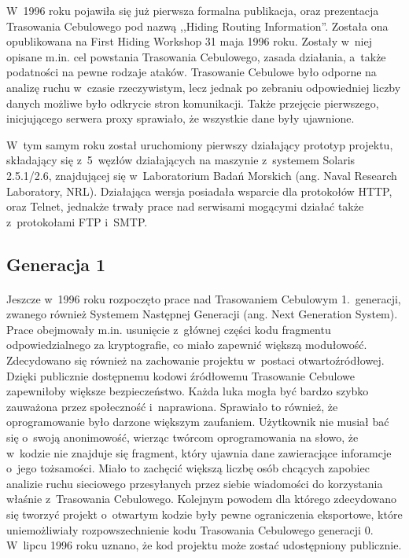 W~1996 roku pojawiła się już pierwsza formalna publikacja, oraz prezentacja Trasowania Cebulowego pod nazwą ,,Hiding Routing Information''. Została ona opublikowana na First Hiding Workshop 31 maja 1996 roku. Zostały w~niej opisane m.in. cel powstania Trasowania Cebulowego, zasada działania, a~także podatności na pewne rodzaje ataków. Trasowanie Cebulowe było odporne na analizę ruchu w~czasie rzeczywistym, lecz jednak po zebraniu odpowiedniej liczby danych możliwe było odkrycie stron komunikacji. Także przejęcie pierwszego, inicjującego serwera proxy sprawiało, że wszystkie dane były ujawnione\cite{hiding_routing_information}.

W~tym samym roku został uruchomiony pierwszy działający prototyp projektu, składający się z~5~węzłów działających na maszynie z~systemem Solaris 2.5.1/2.6, znajdującej się w~Laboratorium Badań Morskich (ang. Naval Research Laboratory, NRL)\cite{onion_router_history}. Działająca wersja posiadała wsparcie dla protokołów HTTP, oraz Telnet, jednakże trwały prace nad serwisami mogącymi działać także z~protokołami FTP i~SMTP\cite{hiding_routing_information}.

\subsection{Generacja 1}\paragraph{}
Jeszcze w~1996 roku rozpoczęto prace nad Trasowaniem Cebulowym 1.~generacji, zwanego również Systemem Następnej Generacji (ang. Next Generation System)\cite{onion_router}. Prace obejmowały m.in. usunięcie z~głównej części kodu fragmentu odpowiedzialnego za kryptografie, co miało zapewnić większą modułowość. Zdecydowano się również na zachowanie projektu w~postaci otwartoźródłowej. Dzięki publicznie dostępnemu kodowi źródłowemu Trasowanie Cebulowe zapewniłoby większe bezpieczeństwo. Każda luka mogła być bardzo szybko zauważona przez społeczność i~naprawiona. Sprawiało to również, że oprogramowanie było darzone większym zaufaniem. Użytkownik nie musiał bać się o~swoją anonimowość, wierząc twórcom oprogramowania na słowo, że w~kodzie nie znajduje się fragment, który ujawnia dane zawieracjące inforamcje o~jego tożsamości. Miało to zachęcić większą liczbę osób chcących zapobiec analizie ruchu sieciowego przesyłanych przez siebie wiadomości do korzystania właśnie z~Trasowania Cebulowego. Kolejnym powodem dla którego zdecydowano się tworzyć projekt o~otwartym kodzie były pewne ograniczenia eksportowe, które uniemożliwiały rozpowszechnienie kodu Trasowania Cebulowego generacji 0. W~lipcu 1996 roku uznano, że kod projektu może zostać udostępniony publicznie.

